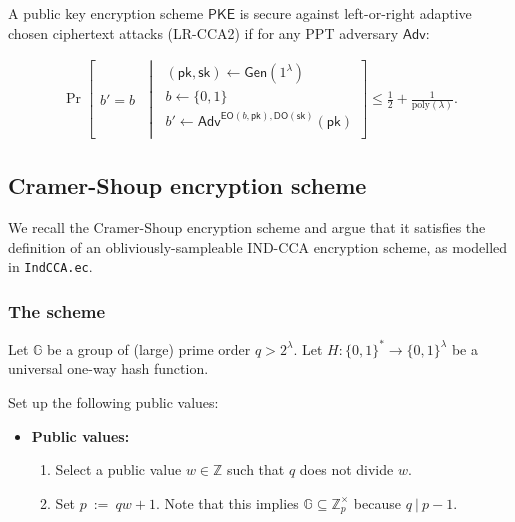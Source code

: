 \documentclass[11pt,letterpaper]{article}
\theoremstyle{plain} %
\theoremstyle{definition} %
\theoremstyle{remark} %
\newcommand{\code}[1]{\texttt{#1}} %
\newcommand{\eqdef}{\ {:=} \ }
\newcommand{\SecParam}{\lambda}
\newcommand{\PKE}{\mathsf{PKE}}
\newcommand{\Gen}{\mathsf{Gen}}
\newcommand{\EncKey}{\mathsf{pk}}
\newcommand{\DecKey}{\mathsf{sk}}
\newcommand{\GuessBit}{b'}
\newcommand{\ChallengerBit}{b}
\newcommand{\EncOracle}{\mathsf{EO}}
\newcommand{\DecOracle}{\mathsf{DO}}
\newcommand{\Adversary}{{\mathsf{Adv}}} %
\newcommand{\pST}{\; \middle| \;}
\newcommand{\poly}{\mathrm{poly}}
\newcommand{\Bits}{\{0,1\}}
\newcommand{\Integers}{\mathbb{Z}}
\newcommand{\Group}{\mathbb{G}}
\newcommand{\GrpOrd}{q}
\newcommand{\Hash}{H}
\begin{document}
A public key encryption scheme $\PKE$ is secure against left-or-right adaptive chosen ciphertext attacks (LR-CCA2) if for any PPT adversary $\Adversary$:

\begin{align*}
	\Pr \left[
	\begin{array}{c}
		\GuessBit = \ChallengerBit
	\end{array}
	\pST
	\begin{array}{r}
		(\EncKey, \DecKey) \gets \Gen(1^{\SecParam})\\
		\ChallengerBit \gets \Bits\\
		\GuessBit \gets \Adversary^{\EncOracle(\ChallengerBit,\EncKey), \DecOracle(\DecKey)}(\EncKey)\\
	\end{array}
	\right] \leq \frac{1}{2} + \frac{1}{\poly(\SecParam)}.
\end{align*}

\subsection{Cramer-Shoup encryption scheme}
\label{sec:cramer-shoup}
We recall the Cramer-Shoup encryption scheme \cite{CramerS98} and argue that it satisfies the definition of an obliviously-sampleable IND-CCA encryption scheme, as modelled in \code{IndCCA.ec}.

\subsubsection{The scheme}
\label{sec:cramer-shoup-scheme}

Let $\Group$ be a group of (large) prime order $\GrpOrd > 2^{\SecParam}$. Let $\Hash \colon \Bits^{*} \to \Bits^{\SecParam}$ be a universal one-way hash function.


\newcommand{\GrpEltG}{g}
\newcommand{\MultGrpOrd}{p}
\newcommand{\MultGrp}{\Integers^{\times}_{\MultGrpOrd}}
\newcommand{\OrdW}{w}
\newcommand{\RandStr}{\mu}
\newcommand{\OblivEltGen}{\mathsf{OblivEltGen}}
\newcommand{\Inv}[1]{{#1}^{-1}}
\newcommand{\OblivEltInv}{\Inv{\mathsf{OblivEltGen}}}
Set up the following public values:
\begin{itemize}
\item[] \textbf{Public values:}
\begin{enumerate}[nolistsep]
    \item Select a public value $\OrdW \in \Integers$ such that $\GrpOrd$ does not divide $\OrdW$.
    \item Set $\MultGrpOrd \eqdef \GrpOrd \OrdW + 1$. Note that this implies $\Group \subseteq \MultGrp$ because $\GrpOrd \:|\: \MultGrpOrd - 1$.
\end{enumerate}
\end{itemize}
\end{document}
